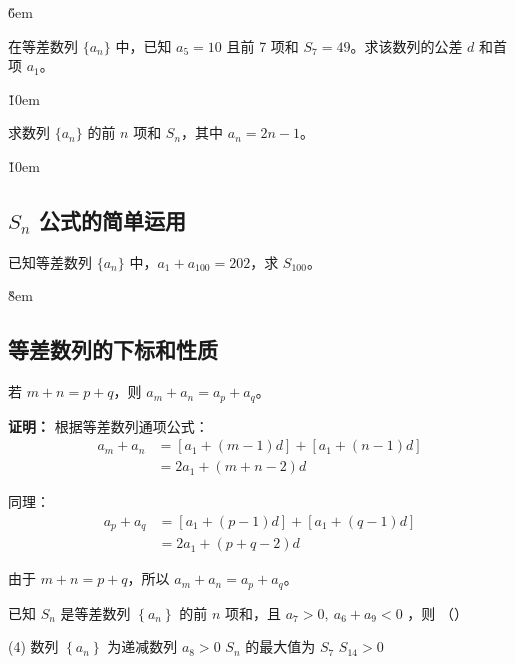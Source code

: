 \v{6em}

\begin{example}
    在等差数列 $\{a_n\}$ 中，已知 $a_5 = 10$ 且前 7 项和 $S_7 = 49$。求该数列的公差 $d$ 和首项 $a_1$。
\end{example}

\v{10em}

\begin{example}
    求数列 $\{a_n\}$ 的前 $n$ 项和 $S_n$，其中 $a_n = 2n - 1$。
\end{example}

\v{10em}

\subsection{$S_n$ 公式的简单运用}

\begin{example}
    已知等差数列 $\{a_n\}$ 中，$a_1 + a_{100} = 202$，求 $S_{100}$。
\end{example}

\v{8em}

\subsection{等差数列的下标和性质}

\begin{theorem}[下标和性质]
    若 $m+n=p+q$，则 $a_m + a_n = a_p + a_q$。

    \textbf{证明：}
    根据等差数列通项公式：
    \begin{align}
        a_m + a_n & = [a_1 + (m-1)d] + [a_1 + (n-1)d] \\
                  & = 2a_1 + (m+n-2)d
    \end{align}

    同理：
    \begin{align}
        a_p + a_q & = [a_1 + (p-1)d] + [a_1 + (q-1)d] \\
                  & = 2a_1 + (p+q-2)d
    \end{align}

    由于 $m+n=p+q$，所以 $a_m + a_n = a_p + a_q$。
\end{theorem}

\begin{example}
    已知 $S_n$ 是等差数列 $\left\{a_n\right\}$ 的前 $n$ 项和，且 $a_7>0, ~ a_6+a_9<0$ ，则 （\qquad）
    \begin{tasks}(4)
        \task 数列 $\left\{a_n\right\}$ 为递减数列
        \task $a_8>0$
        \task $S_n$ 的最大值为 $S_7$
        \task $S_{14}>0$
    \end{tasks}
\end{example}

